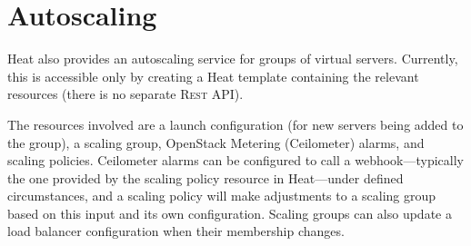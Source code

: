 \section{Autoscaling}

Heat also provides an autoscaling service for groups of virtual servers. Currently, this is accessible only by creating a Heat template containing the relevant resources (there is no separate \textsc{Rest} API).

The resources involved are a launch configuration (for new servers being added to the group), a scaling group, OpenStack Metering (Ceilometer) alarms, and scaling policies. Ceilometer alarms can be configured to call a webhook---typically the one provided by the scaling policy resource in Heat---under defined circumstances, and a scaling policy will make adjustments to a scaling group based on this input and its own configuration. Scaling groups can also update a load balancer configuration when their membership changes.
